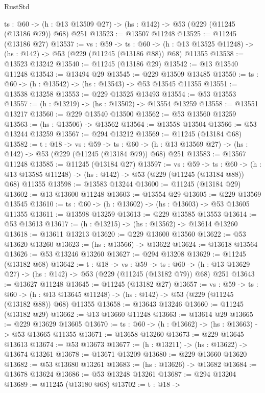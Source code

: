 \begin{lexlean}{RustStd}
\begin{coremodule}
  {ts : @60} -> (h : @13 @13509 @27) -> (hs : @142) -> @53 (@229 (@11245 (@13186 @79)) @68) @251
@13523 := @13507 @11248
@13525 := @11245 (@13186 @27)
@13537 := {vs : @59} ->
  {ts : @60} ->
  (h : @13 @13525 @11248) -> (hs : @142) -> @53 (@229 (@11245 (@13186 @88)) @68) @11355
@13538 := @13523 @13242
@13540 := @11245 (@13186 @29)
@13542 := @13 @13540 @11248
@13543 := @13494 @29
@13545 := @229 @13509 @13485
@13550 := {ts : @60} -> (h : @13542) -> (hs : @13543) -> @53 @13545 @11355
@13551 := @13538 @13258
@13553 := @229 @13525 @13493
@13554 := @53 @13553
@13557 := (h : @13219) -> (hs : @13502) -> @13554 @13259
@13558 := @13551 @13217
@13560 := @229 @13540 @13500
@13562 := @53 @13560 @13259
@13563 := (hs : @13506) -> @13562
@13564 := @13558 @13504
@13566 := @53 @13244 @13259
@13567 := @294 @13212
@13569 := @11245 (@13184 @68)
@13582 := {t : @18} ->
  {vs : @59} ->
  {ts : @60} -> (h : @13 @13569 @27) -> (hs : @142) -> @53 (@229 (@11245 (@13184 @79)) @68) @251
@13583 := @13567 @11248
@13585 := @11245 (@13184 @27)
@13597 := {vs : @59} ->
  {ts : @60} ->
  (h : @13 @13585 @11248) -> (hs : @142) -> @53 (@229 (@11245 (@13184 @88)) @68) @11355
@13598 := @13583 @13244
@13600 := @11245 (@13184 @29)
@13602 := @13 @13600 @11248
@13603 := @13554 @29
@13605 := @229 @13569 @13545
@13610 := {ts : @60} -> (h : @13602) -> (hs : @13603) -> @53 @13605 @11355
@13611 := @13598 @13259
@13613 := @229 @13585 @13553
@13614 := @53 @13613
@13617 := (h : @13215) -> (hs : @13562) -> @13614 @13260
@13618 := @13611 @13213
@13620 := @229 @13600 @13560
@13622 := @53 @13620 @13260
@13623 := (hs : @13566) -> @13622
@13624 := @13618 @13564
@13626 := @53 @13246 @13260
@13627 := @294 @13208
@13629 := @11245 (@13182 @68)
@13642 := {t : @18} ->
  {vs : @59} ->
  {ts : @60} -> (h : @13 @13629 @27) -> (hs : @142) -> @53 (@229 (@11245 (@13182 @79)) @68) @251
@13643 := @13627 @11248
@13645 := @11245 (@13182 @27)
@13657 := {vs : @59} ->
  {ts : @60} ->
  (h : @13 @13645 @11248) -> (hs : @142) -> @53 (@229 (@11245 (@13182 @88)) @68) @11355
@13658 := @13643 @13246
@13660 := @11245 (@13182 @29)
@13662 := @13 @13660 @11248
@13663 := @13614 @29
@13665 := @229 @13629 @13605
@13670 := {ts : @60} -> (h : @13662) -> (hs : @13663) -> @53 @13665 @11355
@13671 := @13658 @13260
@13673 := @229 @13645 @13613
@13674 := @53 @13673
@13677 := (h : @13211) -> (hs : @13622) -> @13674 @13261
@13678 := @13671 @13209
@13680 := @229 @13660 @13620
@13682 := @53 @13680 @13261
@13683 := (hs : @13626) -> @13682
@13684 := @13678 @13624
@13686 := @53 @13248 @13261
@13687 := @294 @13204
@13689 := @11245 (@13180 @68)
@13702 := {t : @18} ->

\end{coremodule}
\end{lexlean}

